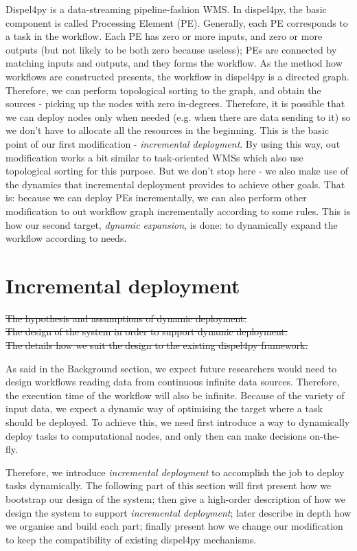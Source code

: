 \documentclass[•]{article}
\begin{document}
	Dispel4py is a data-streaming pipeline-fashion WMS. In dispel4py, the basic component is called Processing Element (PE). Generally, each PE corresponds to a task in the workflow. Each PE has zero or more inputs, and zero or more outputs (but not likely to be both zero because useless); PEs are connected by matching inputs and outputs, and they forms the workflow. As the method how workflows are constructed presents, the workflow in dispel4py is a directed graph. Therefore, we can perform topological sorting to the graph, and obtain the sources - picking up the nodes with zero in-degrees. Therefore, it is possible that we can deploy nodes only when needed (e.g. when there are data sending to it) so we don't have to allocate all the resources in the beginning. This is the basic point of our first modification - \textit{incremental deployment}. By using this way, out modification works a bit similar to task-oriented WMSs which also use topological sorting for this purpose. But we don't stop here - we also make use of the dynamics that incremental deployment provides to achieve other goals. That is: because we can deploy PEs incrementally, we can also perform other modification to out workflow graph incrementally according to some rules. This is how our second target, \textit{dynamic expansion}, is done: to dynamically expand the workflow according to needs.
	
	
	
	\section{Incremental deployment}
	\sout{The hypothesis and assumptions of dynamic deployment. \\
	The design of the system in order to support dynamic deployment. \\
	The details how we suit the design to the existing dispel4py framework.}
	
	As said in the Background section, we expect future researchers would need to design workflows reading data from continuous infinite data sources. Therefore, the execution time of the workflow will also be infinite. Because of the variety of input data, we expect a dynamic way of optimising the target where a task should be deployed. To achieve this, we need first introduce a way to dynamically deploy tasks to computational nodes, and only then can make decisions on-the-fly.
	
	Therefore, we introduce \textit{incremental deployment} to accomplish the job to deploy tasks dynamically. The following part of this section will first present how we bootstrap our design of the system; then give a high-order description of how we design the system to support \textit{incremental deployment}; later describe in depth how we organise and build each part; finally present how we change our modification to keep the compatibility of existing dispel4py mechanisms.
	
\end{document}
